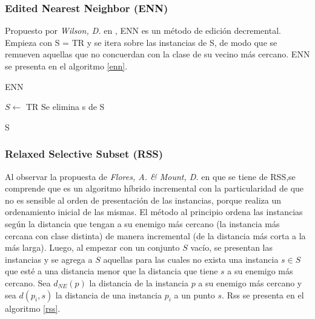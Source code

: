 \subsubsection{Edited Nearest Neighbor (ENN)}

Propuesto por  \emph{Wilson, D.} en \cite{wilson1972asymptotic}, ENN es un método de edición decremental. Empieza con S = TR y se itera sobre las instancias de S, de modo que se remueven aquellas que no concuerdan con la clase de su vecino más cercano. ENN se presenta en el algoritmo \ref{enn}.

\begin{algorithm}
\caption{ENN}
\label{enn}
\begin{algorithmic}[1]


\State $S \gets$ TR
    \State Se elimina s de S
  \EndIf
\EndFor

\State \Return S

\end{algorithmic}
\end{algorithm}

\subsubsection{Relaxed Selective Subset (RSS)}

 Al observar la propuesta de \emph{Flores, A. \& Mount, D.} en \cite{floresnearest} que se tiene de RSS,se comprende que es un algoritmo híbrido incremental con la particularidad de que no es sensible al orden de presentación de las instancias, porque realiza un ordenamiento inicial de las mismas. El método al principio ordena las instancias según la distancia que tengan a su enemigo más cercano (la instancia más cercana con clase distinta) de manera incremental (de la distancia más corta a la más larga). Luego, al empezar con un conjunto $S$ vacío, se presentan las instancias y se agrega a $S$ aquellas para las cuales no exista una instancia $s \in S$ que esté a una distancia menor que la distancia que tiene $s$ a su enemigo más cercano. Sea $d_{NE}(p)$ la distancia de la instancia $p$ a su enemigo más cercano y sea $d(p_i,s)$ la distancia de una instancia $p_i$ a un punto $s$. Rss se presenta en el algoritmo \ref{rss}.

